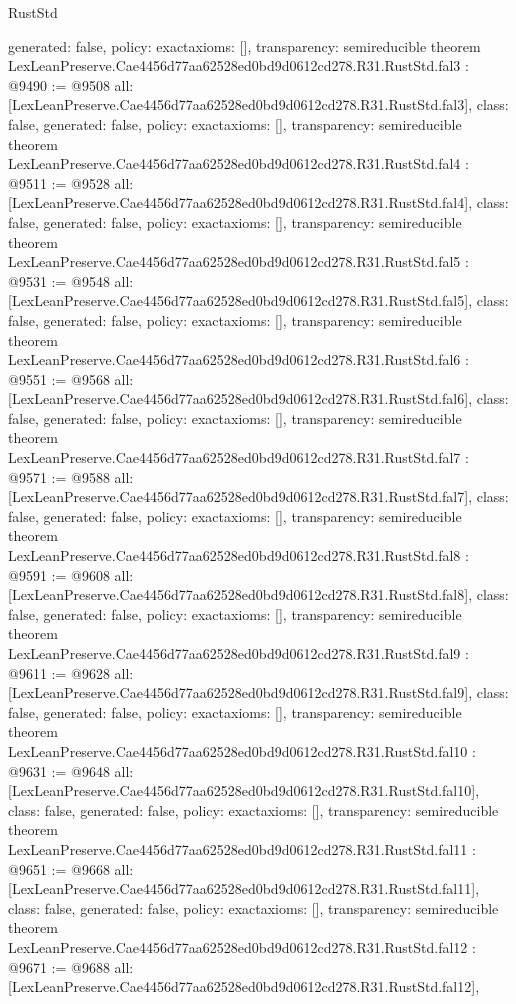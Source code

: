 \begin{lexlean}{RustStd}
\begin{coremodule}
{  generated: false,
  policy: exact{axioms: []},
  transparency: semireducible
}
theorem LexLeanPreserve.Cae4456d77aa62528ed0bd9d0612cd278.R31.RustStd.fal3 : @9490 := @9508 {
  all: [LexLeanPreserve.Cae4456d77aa62528ed0bd9d0612cd278.R31.RustStd.fal3],
  class: false,
  generated: false,
  policy: exact{axioms: []},
  transparency: semireducible
}
theorem LexLeanPreserve.Cae4456d77aa62528ed0bd9d0612cd278.R31.RustStd.fal4 : @9511 := @9528 {
  all: [LexLeanPreserve.Cae4456d77aa62528ed0bd9d0612cd278.R31.RustStd.fal4],
  class: false,
  generated: false,
  policy: exact{axioms: []},
  transparency: semireducible
}
theorem LexLeanPreserve.Cae4456d77aa62528ed0bd9d0612cd278.R31.RustStd.fal5 : @9531 := @9548 {
  all: [LexLeanPreserve.Cae4456d77aa62528ed0bd9d0612cd278.R31.RustStd.fal5],
  class: false,
  generated: false,
  policy: exact{axioms: []},
  transparency: semireducible
}
theorem LexLeanPreserve.Cae4456d77aa62528ed0bd9d0612cd278.R31.RustStd.fal6 : @9551 := @9568 {
  all: [LexLeanPreserve.Cae4456d77aa62528ed0bd9d0612cd278.R31.RustStd.fal6],
  class: false,
  generated: false,
  policy: exact{axioms: []},
  transparency: semireducible
}
theorem LexLeanPreserve.Cae4456d77aa62528ed0bd9d0612cd278.R31.RustStd.fal7 : @9571 := @9588 {
  all: [LexLeanPreserve.Cae4456d77aa62528ed0bd9d0612cd278.R31.RustStd.fal7],
  class: false,
  generated: false,
  policy: exact{axioms: []},
  transparency: semireducible
}
theorem LexLeanPreserve.Cae4456d77aa62528ed0bd9d0612cd278.R31.RustStd.fal8 : @9591 := @9608 {
  all: [LexLeanPreserve.Cae4456d77aa62528ed0bd9d0612cd278.R31.RustStd.fal8],
  class: false,
  generated: false,
  policy: exact{axioms: []},
  transparency: semireducible
}
theorem LexLeanPreserve.Cae4456d77aa62528ed0bd9d0612cd278.R31.RustStd.fal9 : @9611 := @9628 {
  all: [LexLeanPreserve.Cae4456d77aa62528ed0bd9d0612cd278.R31.RustStd.fal9],
  class: false,
  generated: false,
  policy: exact{axioms: []},
  transparency: semireducible
}
theorem LexLeanPreserve.Cae4456d77aa62528ed0bd9d0612cd278.R31.RustStd.fal10 : @9631 := @9648 {
  all: [LexLeanPreserve.Cae4456d77aa62528ed0bd9d0612cd278.R31.RustStd.fal10],
  class: false,
  generated: false,
  policy: exact{axioms: []},
  transparency: semireducible
}
theorem LexLeanPreserve.Cae4456d77aa62528ed0bd9d0612cd278.R31.RustStd.fal11 : @9651 := @9668 {
  all: [LexLeanPreserve.Cae4456d77aa62528ed0bd9d0612cd278.R31.RustStd.fal11],
  class: false,
  generated: false,
  policy: exact{axioms: []},
  transparency: semireducible
}
theorem LexLeanPreserve.Cae4456d77aa62528ed0bd9d0612cd278.R31.RustStd.fal12 : @9671 := @9688 {
  all: [LexLeanPreserve.Cae4456d77aa62528ed0bd9d0612cd278.R31.RustStd.fal12],
}
\end{coremodule}
\end{lexlean}
